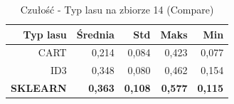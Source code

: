 \begin{table}[htbp]
\centering
\small
\setlength{\tabcolsep}{6pt}
\renewcommand{\arraystretch}{1.2}
\caption{Czułość - Typ lasu na zbiorze 14 (Compare)}
\label{tab:Compare_on_14_recall}
\begin{tabular}{r|r|r|r|r}
\toprule
Typ lasu & Średnia & Std & Maks & Min \\
\hline
CART & 0,214 & 0,084 & 0,423 & 0,077 \\
ID3 & 0,348 & 0,080 & 0,462 & 0,154 \\
\textbf{SKLEARN} & \textbf{0,363} & \textbf{0,108} & \textbf{0,577} & \textbf{0,115} \\
\bottomrule
\end{tabular}
\end{table}